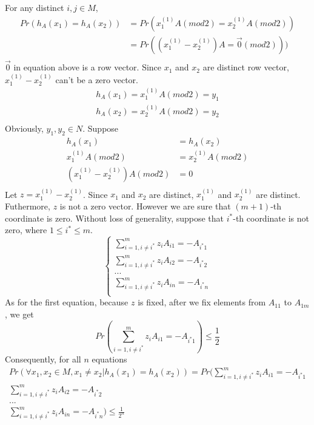 \documentclass{article}
\begin{document}
	\section{}
	For any distinct $i, j \in M$,
	$$
	\begin{aligned}
	Pr(h_A(x_1)=h_A(x_2))&=Pr(x_1^{(1)}A(mod2)=x_2^{(1)}A(mod2))\\
	&=Pr((x_1^{(1)}-x_2^{(1)})A=\vec{0}(mod2)))\\
	\end{aligned}
	$$
	$\vec{0}$ in equation above is a row vector. Since $x_1$ and $x_2$ are distinct row vector, $x_1^{(1)}-x_2^{(1)}$ can't be a zero vector.
	$$
	\begin{aligned}
	h_A(x_1) = x_1^{(1)}A(mod2)=y_1\\
	h_A(x_2) = x_2^{(1)}A(mod2)=y_2\\
	\end{aligned}
	$$
	Obviously, $y_1, y_2 \in N$.
	Suppose
	$$
	\begin{aligned}
	h_A(x_1)&=h_A(x_2)\\
	x_1^{(1)}A(mod2) &= x_2^{(1)}A(mod2)\\
	(x_1^{(1)}-x_2^{(1)})A(mod2)&=0\\
	\end{aligned}
	$$
	Let $z=x_1^{(1)}-x_2^{(1)}$. Since $x_1$ and $x_2$ are distinct, $x_1^{(1)}$ and $x_2^{(1)}$ are distinct. Futhermore, $z$ is not a zero vector. However we are sure that $(m+1)$-th coordinate is zero.
	Without loss of generality, suppose that $i^*$-th coordinate is not zero, where $1 \leq i^* \leq m$.
	$$
	\begin{cases}
	\sum_{i=1,i \neq i^*}^{m}z_iA_{i1}=-A_{i^*1}\\
	\sum_{i=1,i \neq i^*}^{m}z_iA_{i2}=-A_{i^*2}\\
	...\\
	\sum_{i=1,i \neq i^*}^{m}z_iA_{in}=-A_{i^*n}\\
	\end{cases}
	$$
	As for the first equation, because $z$ is fixed, after we fix elements from $A_{11}$ to $A_{1m}$, we get
	$$
	Pr(\sum_{i=1,i \neq i^*}^{m}z_iA_{i1}=-A_{i^*1}) \leq \frac{1}{2}
	$$
	Consequently, for all $n$ equations
	$$
	\begin{aligned}
	Pr(\forall x_1,x_2 \in M, x_1 \neq x_2|h_A(x_1)=h_A(x_2))=Pr(\sum_{i=1,i \neq i^*}^{m}z_iA_{i1}=-A_{i^*1}\\
	\sum_{i=1,i \neq i^*}^{m}z_iA_{i2}=-A_{i^*2}\\
	...\\
	\sum_{i=1,i \neq i^*}^{m}z_iA_{in}=-A_{i^*n}) \leq \frac{1}{2^n}
	\end{aligned}
	$$
\end{document}
